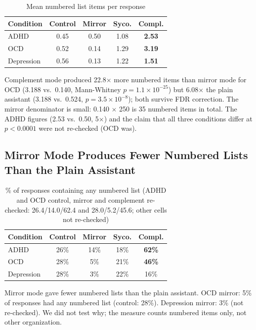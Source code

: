 \documentclass[conference]{IEEEtran}
\begin{document}
\begin{table}[htbp]
\centering
\caption{Mean numbered list items per response}
\label{tab:structure}
\begin{tabular}{lcccc}
\toprule
\textbf{Condition} & \textbf{Control} & \textbf{Mirror} & \textbf{Syco.} & \textbf{Compl.} \\
\midrule
ADHD & 0.45 & 0.50 & 1.08 & \textbf{2.53} \\
OCD & 0.52 & 0.14 & 1.29 & \textbf{3.19} \\
Depression & 0.56 & 0.13 & 1.22 & \textbf{1.51} \\
\bottomrule
\end{tabular}
\end{table}

Complement mode produced 22.8$\times$ more numbered items than mirror mode for OCD (3.188 vs.\ 0.140, Mann-Whitney $p = 1.1\times10^{-25}$) but 6.08$\times$ the plain assistant (3.188 vs.\ 0.524, $p = 3.5\times10^{-8}$); both survive FDR correction. The mirror denominator is small: 0.140 $\times$ 250 is 35 numbered items in total. The ADHD figures (2.53 vs.\ 0.50, 5$\times$) and the claim that all three conditions differ at $p < 0.0001$ were not re-checked (OCD was).

\subsection{Mirror Mode Produces Fewer Numbered Lists Than the Plain Assistant}

\begin{table}[htbp]
\centering
\caption{\% of responses containing any numbered list (ADHD and OCD control, mirror and complement re-checked: 26.4/14.0/62.4 and 28.0/5.2/45.6; other cells not re-checked)}
\label{tab:haslist}
\begin{tabular}{lcccc}
\toprule
\textbf{Condition} & \textbf{Control} & \textbf{Mirror} & \textbf{Syco.} & \textbf{Compl.} \\
\midrule
ADHD & 26\% & 14\% & 18\% & \textbf{62\%} \\
OCD & 28\% & 5\% & 21\% & \textbf{46\%} \\
Depression & 28\% & 3\% & 22\% & 16\% \\
\bottomrule
\end{tabular}
\end{table}

Mirror mode gave fewer numbered lists than the plain assistant. OCD mirror: 5\% of responses had any numbered list (control: 28\%). Depression mirror: 3\% (not re-checked). We did not test why; the measure counts numbered items only, not other organization.
\end{document}
